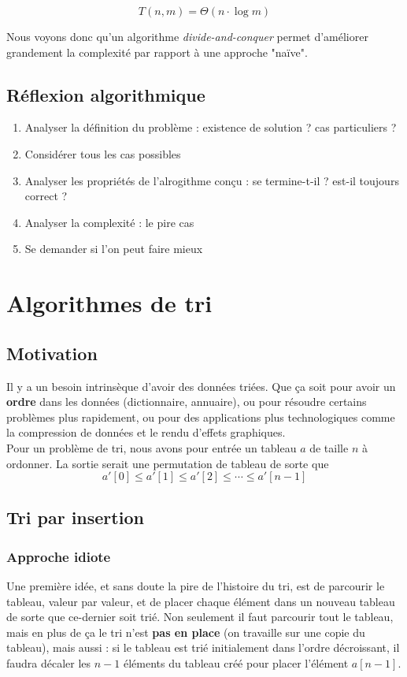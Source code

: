 \documentclass[12pt,a4paper]{book}
\newcommand{\divc}{\textit{divide-and-conquer} }
\begin{document}
$$\boxed{T(n,m) = \Theta\left(n\cdot \log m\right)}$$

Nous voyons donc qu'un algorithme \divc permet d'améliorer grandement la complexité par rapport à une approche "naïve".

\section{Réflexion algorithmique}
\begin{enumerate}
\item Analyser la définition du problème : existence de solution ? cas particuliers ?
\item Considérer tous les cas possibles
\item Analyser les propriétés de l'alrogithme conçu : se termine-t-il ? est-il toujours correct ?
\item Analyser la complexité : le pire cas
\item Se demander si l'on peut faire mieux
\end{enumerate}

\chapter{Algorithmes de tri}
\section{Motivation}
Il y a un besoin intrinsèque d'avoir des données triées. Que ça soit pour avoir un \textbf{ordre} dans les données (dictionnaire, annuaire), ou pour résoudre certains problèmes plus rapidement, ou pour des applications plus technologiques comme la compression de données et le rendu d'effets graphiques. \\

Pour un problème de tri, nous avons pour entrée un tableau $a$ de taille $n$ à ordonner. La sortie serait une permutation de tableau de sorte que 
$$a'[0]\leq a'[1]\leq a'[2]\leq\cdots \leq a'[n-1]$$
\section{Tri par insertion}
\subsection{Approche idiote}
Une première idée, et sans doute la pire de l'histoire du tri, est de parcourir le tableau, valeur par valeur, et de placer chaque élément dans un nouveau tableau de sorte que ce-dernier soit trié. Non seulement il faut parcourir tout le tableau, mais en plus de ça le tri n'est \textbf{pas en place} (on travaille sur une copie du tableau), mais aussi : si le tableau est trié initialement dans l'ordre décroissant, il faudra décaler les $n-1$ éléments du tableau créé pour placer l'élément $a[n-1]$. \\
\end{document}

